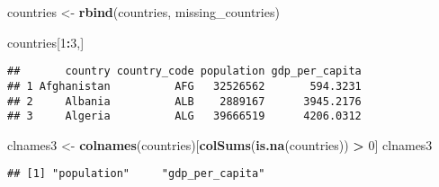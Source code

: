 \documentclass[]{article}
\newenvironment{Shaded}{\begin{snugshade}}{\end{snugshade}}
\newcommand{\CommentTok}[1]{\textcolor[rgb]{0.56,0.35,0.01}{\textit{#1}}}
\newcommand{\DataTypeTok}[1]{\textcolor[rgb]{0.13,0.29,0.53}{#1}}
\newcommand{\DecValTok}[1]{\textcolor[rgb]{0.00,0.00,0.81}{#1}}
\newcommand{\KeywordTok}[1]{\textcolor[rgb]{0.13,0.29,0.53}{\textbf{#1}}}
\newcommand{\NormalTok}[1]{#1}
\newcommand{\OperatorTok}[1]{\textcolor[rgb]{0.81,0.36,0.00}{\textbf{#1}}}
\newcommand{\OtherTok}[1]{\textcolor[rgb]{0.56,0.35,0.01}{#1}}
\newcommand{\StringTok}[1]{\textcolor[rgb]{0.31,0.60,0.02}{#1}}
\begin{document}
\begin{Shaded}
\begin{Highlighting}[]
\NormalTok{    countries <-}\StringTok{ }\KeywordTok{rbind}\NormalTok{(countries, missing_countries)}

\NormalTok{    countries[}\DecValTok{1}\OperatorTok{:}\DecValTok{3}\NormalTok{,]}
\end{Highlighting}
\end{Shaded}

\begin{verbatim}
##       country country_code population gdp_per_capita
## 1 Afghanistan          AFG   32526562       594.3231
## 2     Albania          ALB    2889167      3945.2176
## 3     Algeria          ALG   39666519      4206.0312
\end{verbatim}

\begin{Shaded}
\begin{Highlighting}[]
\NormalTok{    clnames3 <-}\StringTok{ }\KeywordTok{colnames}\NormalTok{(countries)[}\KeywordTok{colSums}\NormalTok{(}\KeywordTok{is.na}\NormalTok{(countries)) }\OperatorTok{>}\StringTok{ }\DecValTok{0}\NormalTok{]}
\NormalTok{    clnames3}
\end{Highlighting}
\end{Shaded}

\begin{verbatim}
## [1] "population"     "gdp_per_capita"
\end{verbatim}

\begin{Shaded}
\end{Shaded}
\end{document}
